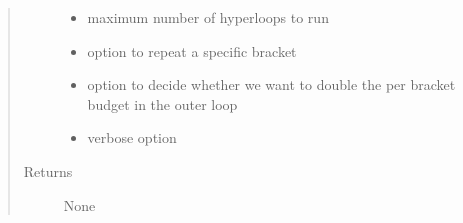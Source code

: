 \documentclass[letterpaper,10pt,english]{sphinxmanual}
\begin{document}
\begin{fulllineitems}
\begin{quote}
\begin{description}
\begin{itemize}
\item {} 
 \textendash{} maximum number of hyperloops to run

\item {} 
 \textendash{} option to repeat a specific bracket

\item {} 
 \textendash{} option to decide whether we want to double the per bracket budget in the outer loop

\item {} 
 \textendash{} verbose option

\end{itemize}

\item[{Returns}] \leavevmode
None

\end{description}\end{quote}

\end{fulllineitems}

\label{\detokenize{index:module-heuristics.ttts}}
\end{document}
